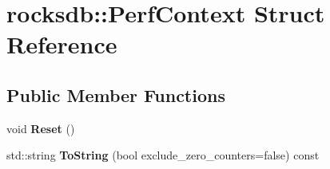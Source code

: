 \hypertarget{structrocksdb_1_1PerfContext}{}\section{rocksdb\+:\+:Perf\+Context Struct Reference}
\label{structrocksdb_1_1PerfContext}
\subsection*{Public Member Functions}
\begin{DoxyCompactItemize}
\item 
void {\bfseries Reset} ()\hypertarget{structrocksdb_1_1PerfContext_ac2c04bd14e4d8f51335e93aaeb10f7d2}{}\label{structrocksdb_1_1PerfContext_ac2c04bd14e4d8f51335e93aaeb10f7d2}

\item 
std\+::string {\bfseries To\+String} (bool exclude\+\_\+zero\+\_\+counters=false) const\hypertarget{structrocksdb_1_1PerfContext_aea9da9ad9fc08a0f8e7776e96aed19b8}{}\label{structrocksdb_1_1PerfContext_aea9da9ad9fc08a0f8e7776e96aed19b8}

\end{DoxyCompactItemize}

